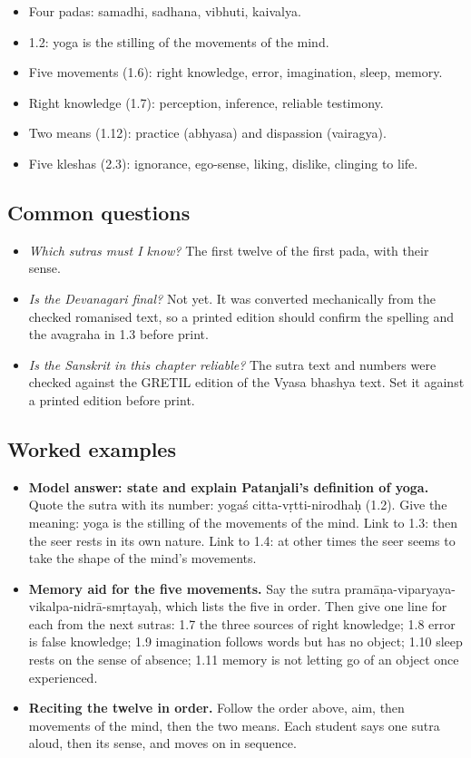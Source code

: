 \begin{recall}
\begin{itemize}
\item Four padas: samadhi, sadhana, vibhuti, kaivalya.
\item 1.2: yoga is the stilling of the movements of the mind.
\item Five movements (1.6): right knowledge, error, imagination, sleep, memory.
\item Right knowledge (1.7): perception, inference, reliable testimony.
\item Two means (1.12): practice (abhyasa) and dispassion (vairagya).
\item Five kleshas (2.3): ignorance, ego-sense, liking, dislike, clinging to life.
\end{itemize}
\end{recall}

\subsection*{Common questions}
\begin{itemize}
\item \emph{Which sutras must I know?} The first twelve of the first pada, with their sense.
\item \emph{Is the Devanagari final?} Not yet. It was converted mechanically from the checked romanised text, so a printed edition should confirm the spelling and the avagraha in 1.3 before print.
\item \emph{Is the Sanskrit in this chapter reliable?} The sutra text and numbers were checked against the GRETIL edition of the Vyasa bhashya text. Set it against a printed edition before print.
\end{itemize}

\subsection*{Worked examples}
\begin{itemize}
\item \textbf{Model answer: state and explain Patanjali's definition of yoga.} Quote the sutra with its number: yogaś citta-vṛtti-nirodhaḥ (1.2). Give the meaning: yoga is the stilling of the movements of the mind. Link to 1.3: then the seer rests in its own nature. Link to 1.4: at other times the seer seems to take the shape of the mind's movements.
\item \textbf{Memory aid for the five movements.} Say the sutra pramāṇa-viparyaya-vikalpa-nidrā-smṛtayaḥ, which lists the five in order. Then give one line for each from the next sutras: 1.7 the three sources of right knowledge; 1.8 error is false knowledge; 1.9 imagination follows words but has no object; 1.10 sleep rests on the sense of absence; 1.11 memory is not letting go of an object once experienced.
\item \textbf{Reciting the twelve in order.} Follow the order above, aim, then movements of the mind, then the two means. Each student says one sutra aloud, then its sense, and moves on in sequence.
\end{itemize}

